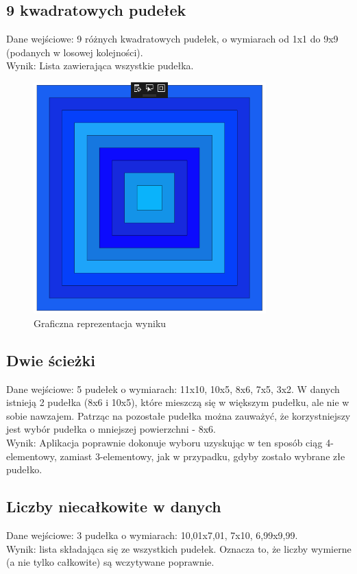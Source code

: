 \documentclass{article}
\begin{document}
\subsection{9 kwadratowych pudełek}
Dane wejściowe: 9 różnych kwadratowych pudełek, o wymiarach od 1x1 do 9x9 (podanych w losowej kolejności).  \\
Wynik: Lista zawierająca wszystkie pudełka.
\begin{figure}[H]
\centering
\includegraphics[width=0.8\textwidth]{square_boxes_res.png}
\caption{Graficzna reprezentacja wyniku}
\end{figure}

\subsection{Dwie ścieżki}
Dane wejściowe: 5 pudełek o wymiarach: 11x10, 10x5, 8x6, 7x5, 3x2. W danych istnieją 2 pudełka (8x6 i 10x5), które mieszczą się w większym pudełku, ale nie w sobie nawzajem. Patrząc na pozostałe pudełka można zauważyć, że korzystniejszy jest wybór pudełka o mniejszej powierzchni - 8x6.\\
Wynik: Aplikacja poprawnie dokonuje wyboru uzyskując w ten sposób ciąg 4-elementowy, zamiast 3-elementowy, jak w przypadku, gdyby zostało wybrane złe pudełko.

\subsection{Liczby niecałkowite w danych}
Dane wejściowe: 3 pudełka o wymiarach: 10,01x7,01, 7x10, 6,99x9,99.\\
Wynik: lista składająca się ze wszystkich pudełek. Oznacza to, że liczby wymierne (a nie tylko całkowite) są wczytywane poprawnie.
\end{document}
